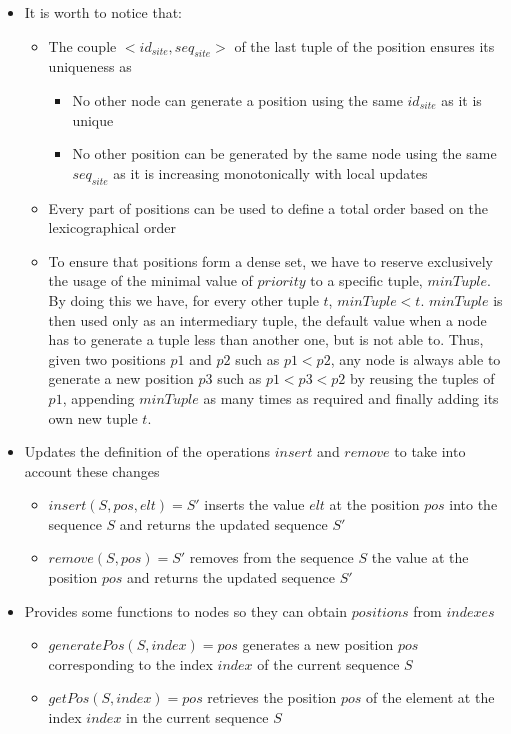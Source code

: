 \documentclass{article}
\begin{document}
\begin{itemize}
    \item It is worth to notice that: 
    \begin{itemize}
        \item The couple $<id_{site}, seq_{site}>$ of the last tuple of the position ensures its uniqueness as
        \begin{itemize}
            \item No other node can generate a position using the same $id_{site}$ as it is unique
            \item No other position can be generated by the same node using the same $seq_{site}$ as it is increasing monotonically with local updates
        \end{itemize}
        \item Every part of positions can be used to define a total order based on the lexicographical order
        \item To ensure that positions form a dense set, we have to reserve exclusively the usage of the minimal value of $priority$ to a specific tuple, $minTuple$. By doing this we have, for every other tuple $t$, $minTuple < t$. $minTuple$ is then used only as an intermediary tuple, the default value when a node has to generate a tuple less than another one, but is not able to. Thus, given two positions $p1$ and $p2$ such as $p1 < p2$, any node is always able to generate a new position $p3$ such as $p1 < p3 < p2$ by reusing the tuples of $p1$, appending $minTuple$ as many times as required and finally adding its own new tuple $t$.
    \end{itemize}
    \item Updates the definition of the operations $insert$ and $remove$ to take into account these changes
    \begin{itemize}
        \item $insert(S, pos, elt) = S'$ inserts the value $elt$ at the position $pos$ into the sequence $S$ and returns the updated sequence $S'$
        \item $remove(S, pos) = S'$ removes from the sequence $S$ the value at the position $pos$ and returns the updated sequence $S'$
    \end{itemize}
    \item Provides some functions to nodes so they can obtain $positions$ from $indexes$
    \begin{itemize}
        \item $generatePos(S, index) = pos$ generates a new position $pos$ corresponding to the index $index$ of the current sequence $S$
        \item $getPos(S, index) = pos$ retrieves the position $pos$ of the element at the index $index$ in the current sequence $S$
    \end{itemize}
\end{itemize}
\end{document}
